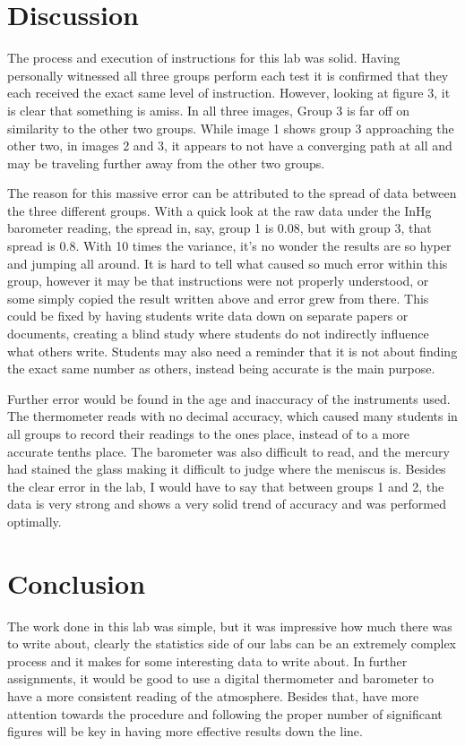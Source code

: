 \documentclass[conf]{new-aiaa}
\begin{document}
\section{Discussion}
The process and execution of instructions for this lab was solid. Having personally witnessed all three groups perform each test it is confirmed that they each received the exact same level of instruction. However, looking at figure 3, it is clear that something is amiss. In all three images, Group 3 is far off on similarity to the other two groups. While image 1 shows group 3 approaching the other two, in images 2 and 3, it appears to not have a converging path at all and may be traveling further away from the other two groups.\par
The reason for this massive error can be attributed to the spread of data between the three different groups. With a quick look at the raw data under the InHg barometer reading, the spread in, say, group 1 is 0.08, but with group 3, that spread is 0.8. With 10 times the variance, it's no wonder the results are so hyper and jumping all around. It is hard to tell what caused so much error within this group, however it may be that instructions were not properly understood, or some simply copied the result written above and error grew from there. This could be fixed by having students write data down on separate papers or documents, creating a blind study where students do not indirectly influence what others write. Students may also need a reminder that it is not about finding the exact same number as others, instead being accurate is the main purpose.\par
Further error would be found in the age and inaccuracy of the instruments used. The thermometer reads with no decimal accuracy, which caused many students in all groups to record their readings to the ones place, instead of to a more accurate tenths place. The barometer was also difficult to read, and the mercury had stained the glass making it difficult to judge where the meniscus is. Besides the clear error in the lab, I would have to say that between groups 1 and 2, the data is very strong and shows a very solid trend of accuracy and was performed optimally.
\section{Conclusion}
The work done in this lab was simple, but it was impressive how much there was to write about, clearly the statistics side of our labs can be an extremely complex process and it makes for some interesting data to write about. In further assignments, it would be good to use a digital thermometer and barometer to have a more consistent reading of the atmosphere. Besides that, have more attention towards the procedure and following the proper number of significant figures will be key in having more effective results down the line.
\pagebreak
\end{document}

